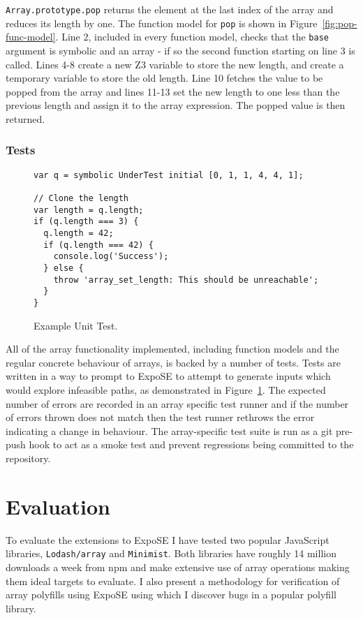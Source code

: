 \documentclass[]{final_report}
\begin{document}
\lstinline|Array.prototype.pop| returns the element at the last index of the array and reduces its length by one. The function model for \lstinline|pop| is shown in Figure~\ref{fig:pop-func-model}. Line 2, included in every function model, checks that the \lstinline|base| argument is symbolic and an array - if so the second function starting on line 3 is called. Lines 4-8 create a new Z3 variable to store the new length, and create a temporary variable to store the old length. Line 10 fetches the value to be popped from the array and lines 11-13 set the new length to one less than the previous length and assign it to the array expression. The popped value is then returned.


\subsection{Tests}
\begin{figure}[t]
\begin{lstlisting}
var q = symbolic UnderTest initial [0, 1, 1, 4, 4, 1];

// Clone the length
var length = q.length;
if (q.length === 3) {
  q.length = 42;
  if (q.length === 42) {
    console.log('Success');
  } else {
    throw 'array_set_length: This should be unreachable';
  }
}
\end{lstlisting}
\caption{\label{fig:example-length-test} Example Unit Test.}
\end{figure}

All of the array functionality implemented, including function models and the regular concrete behaviour of arrays, is backed by a number of tests. Tests are written in a way to prompt to ExpoSE to attempt to generate inputs which would explore infeasible paths, as demonstrated in Figure~\ref{fig:example-length-test}. The expected number of errors are recorded in an array specific test runner and if the number of errors thrown does not match then the test runner rethrows the error indicating a change in behaviour. The array-specific test suite is run as a git pre-push hook to act as a smoke test and prevent regressions being committed to the repository.

\chapter{Evaluation}
To evaluate the extensions to ExpoSE I have tested two popular JavaScript libraries, \lstinline|Lodash/array| and \lstinline|Minimist|. Both libraries have roughly 14 million downloads a week from npm and make extensive use of array operations making them ideal targets to evaluate. I also present a methodology for verification of array polyfills using ExpoSE using which I discover bugs in a popular polyfill library.
\end{document}
